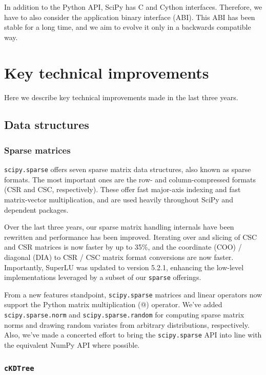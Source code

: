 \documentclass[fleqn,10pt]{wlscirep}
\begin{document}
In addition to the Python API, SciPy has C and Cython interfaces.
Therefore, we have to also consider the application binary
interface (ABI). This ABI has been stable for a long time, and we aim to
evolve it only in a backwards compatible way.

\section*{Key technical improvements}
\label{sec:technical_improvements}
Here we describe key technical improvements made in the last three years.

\subsection*{Data structures}

\subsubsection*{Sparse matrices}

\texttt{scipy.sparse} offers seven sparse matrix data structures,
also known as sparse formats. The most important ones are the row- 
and column-compressed formats (CSR and CSC, respectively). 
These offer fast major-axis indexing and fast matrix-vector multiplication,
and are used heavily throughout SciPy and dependent packages.

Over the last three years, our sparse matrix handling internals have been
rewritten and performance has been improved. Iterating over and slicing of CSC
and CSR matrices is now faster by up to 35\%, %
and the coordinate (COO) / diagonal (DIA) to CSR / CSC matrix format
conversions are now faster. %
Importantly,
SuperLU\cite{superlu_ug99} was updated to version 5.2.1, enhancing the
low-level implementations leveraged by a subset of our \texttt{sparse}
offerings.

From a new features standpoint, \texttt{scipy.sparse} matrices and linear
operators now support the Python matrix multiplication (@) operator.
We've added \texttt{scipy.sparse.norm} and
\texttt{scipy.sparse.random} for computing sparse matrix norms and drawing
random variates from arbitrary distributions, respectively. Also, we've made a
concerted effort to bring the \texttt{scipy.sparse} API into line with the
equivalent NumPy API where possible.

\subsubsection*{\texttt{cKDTree}}
\end{document}
